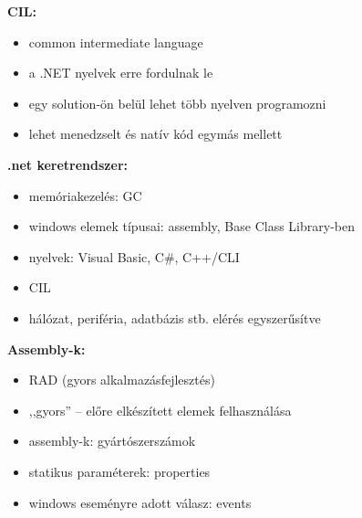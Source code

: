 \textbf{CIL:}
\begin{itemize}
    \item common intermediate language
    \item a .NET nyelvek erre fordulnak le
    \item egy solution-ön belül lehet több nyelven programozni
    \item lehet menedzselt és natív kód egymás mellett
\end{itemize}

\textbf{.net keretrendszer:}
\begin{itemize}
    \item memóriakezelés: GC
    \item windows elemek típusai: assembly, Base Class Library-ben
    \item nyelvek: Visual Basic, C\#, C++/CLI
    \item CIL
    \item hálózat, periféria, adatbázis stb. elérés egyszerűsítve
\end{itemize}

\textbf{Assembly-k:}
\begin{itemize}
    \item RAD (gyors alkalmazásfejlesztés)
    \item ,,gyors'' -- előre elkészített elemek felhasználása
    \item assembly-k: gyártószerszámok
    \item statikus paraméterek: properties
    \item windows eseményre adott válasz: events
\end{itemize}

